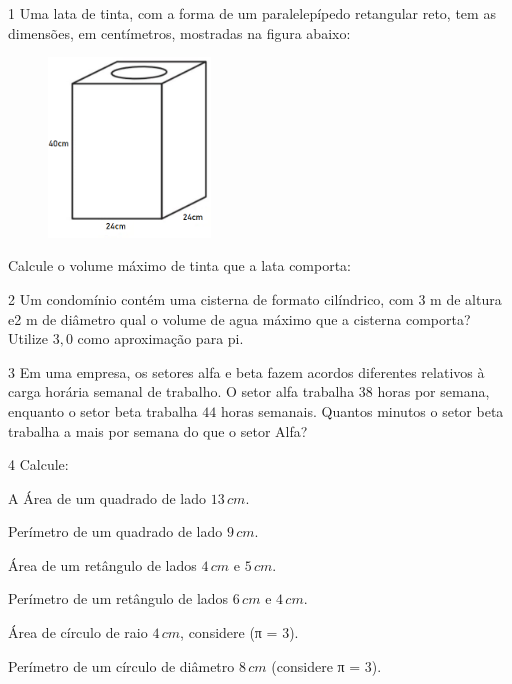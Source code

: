 
\num{1}  Uma lata de tinta, com a forma de um paralelepípedo retangular reto,
tem as dimensões, em centímetros, mostradas na figura abaixo:

\begin{figure}
\includegraphics[width=1.69792in,height=1.88115in]{./imgSAEB_6_MAT/media/image95.png}
\end{figure}

Calcule o volume máximo de tinta que a lata comporta:


\num{2}  Um condomínio contém uma cisterna de formato cilíndrico, com $3$ m de
altura e2 m de diâmetro qual o volume de agua máximo que a cisterna
comporta? Utilize $3,0$ como aproximação para pi.


\num{3}  Em uma empresa, os setores alfa e beta fazem acordos diferentes
relativos à carga horária semanal de trabalho. O setor alfa trabalha $38$
horas por semana, enquanto o setor beta trabalha $44$ horas semanais.
Quantos minutos o setor beta trabalha a mais por semana do que o setor
Alfa? 


\num{4} Calcule:

\begin{escolha}
\item A Área de um quadrado de lado $13\,cm$. 
\item Perímetro de um quadrado de lado $9\,cm$. 
\item Área de um retângulo de lados $4\,cm$ e $5\,cm$. 
\item Perímetro de um retângulo de lados $6\,cm$ e $4\,cm$. 
\item Área de círculo de raio $4\,cm$, considere (π = $3$). 
\item Perímetro de um círculo de diâmetro $8\,cm$ (considere π = $3$). 
\end{escolha}

